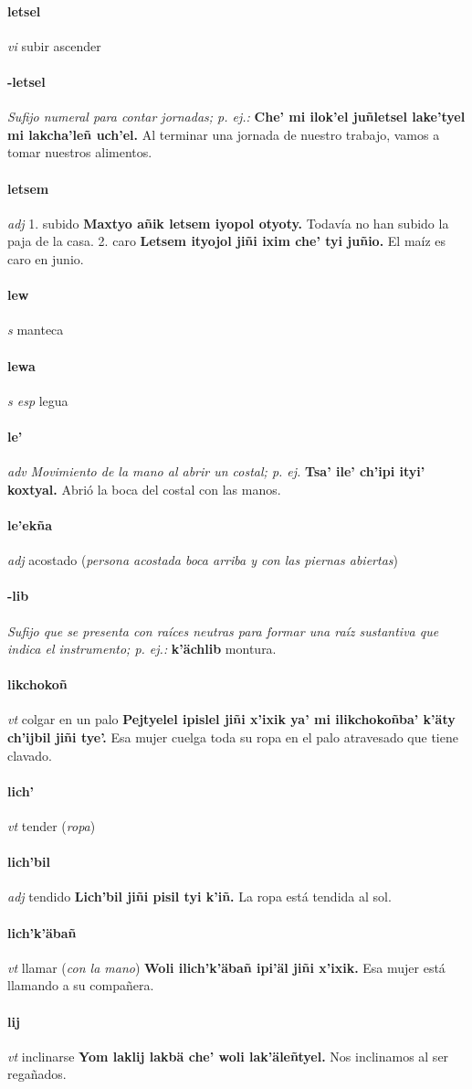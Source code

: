 \documentclass{scrbook}
\newcommand{\entry}[1]{\paragraph{#1}}
\newcommand{\onedefinition}[1]{#1.}
\newcommand{\nontranslationdef}[1]{\textit{#1}}
\newcommand{\partofspeech}[1]{\textit{#1}}
\newcommand{\spanishtranslation}[1]{#1}
\newcommand{\clarification}[1]{(\textit{#1})}
\newcommand{\cholexample}[1]{\textbf{#1}}
\newcommand{\exampletranslation}[1]{#1}
\begin{document}
\begin{multicols}{2}
\entry{letsel}
\partofspeech{vi}
\spanishtranslation{subir}
\spanishtranslation{ascender}

\entry{-letsel}
\nontranslationdef{Sufijo numeral para contar jornadas; p. ej.:}
\cholexample{Che' mi ilok'el juñletsel lake'tyel mi lakcha'leñ uch'el.}
\exampletranslation{Al terminar una jornada de nuestro trabajo, vamos a tomar nuestros alimentos.}

\entry{letsem}
\partofspeech{adj}
\onedefinition{1}
\spanishtranslation{subido}
\cholexample{Maxtyo añik letsem iyopol otyoty.}
\exampletranslation{Todavía no han subido la paja de la casa.}
\onedefinition{2}
\spanishtranslation{caro}
\cholexample{Letsem ityojol jiñi ixim che' tyi juñio.}
\exampletranslation{El maíz es caro en junio.}

\entry{lew}
\partofspeech{s}
\spanishtranslation{manteca}

\entry{lewa}
\partofspeech{s esp}
\spanishtranslation{legua}

\entry{le'}
\partofspeech{adv}
\nontranslationdef{Movimiento de la mano al abrir un costal; p. ej.}
\cholexample{Tsa' ile' ch'ipi ityi' koxtyal.}
\exampletranslation{Abrió la boca del costal con las manos.}

\entry{le'ekña}
\partofspeech{adj}
\spanishtranslation{acostado}
\clarification{persona acostada boca arriba y con las piernas abiertas}

\entry{-lib}
\nontranslationdef{Sufijo que se presenta con raíces neutras para formar una raíz sustantiva que indica el instrumento; p. ej.:}
\cholexample{k'ächlib}
\exampletranslation{montura.}

\entry{likchokoñ}
\partofspeech{vt}
\spanishtranslation{colgar en un palo}
\cholexample{Pejtyelel ipislel jiñi x'ixik ya' mi ilikchokoñba' k'äty ch'ijbil jiñi tye'.}
\exampletranslation{Esa mujer cuelga toda su ropa en el palo atravesado que tiene clavado.}

\entry{lich'}
\partofspeech{vt}
\spanishtranslation{tender}
\clarification{ropa}

\entry{lich'bil}
\partofspeech{adj}
\spanishtranslation{tendido}
\cholexample{Lich'bil jiñi pisil tyi k'iñ.}
\exampletranslation{La ropa está tendida al sol.}

\entry{lich'k'äbañ}
\partofspeech{vt}
\spanishtranslation{llamar}
\clarification{con la mano}
\cholexample{Woli ilich'k'äbañ ipi'äl jiñi x'ixik.}
\exampletranslation{Esa mujer está llamando a su compañera.}

\entry{lij}
\partofspeech{vt}
\spanishtranslation{inclinarse}
\cholexample{Yom laklij lakbä che' woli lak'äleñtyel.}
\exampletranslation{Nos inclinamos al ser regañados.}


\end{multicols}
\end{document}
